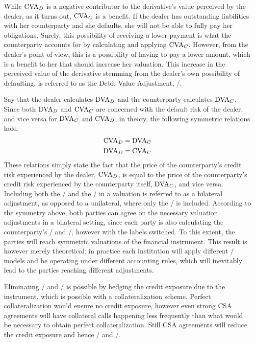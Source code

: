 \documentclass[main.tex]{subfiles}
\begin{document}
        While $\CVA/_{D}$ is a negative contributor to the derivative's value perceived by the dealer, 
        as it turns out, $\CVA/_{C}$ is a benefit.
        If the dealer has outstanding liabilities with her counterparty
        and she defaults, she will not be able to fully pay her obligations. 
        Surely, this possibility of receiving a lower payment is what the counterparty accounts for 
        by calculating and applying $\CVA/_{C}$.
        However, from the dealer's point of view, this is a possibility of having to pay a lower amount,
        which is a benefit to her that should increase her valuation.
        This increase in the perceived value of the derivative
        stemming from the dealer's own possibility of defaulting, 
        is referred to as the Debit Value Adjustment, \DVA/.

        Say that the dealer calculates $\DVA/_{D}$ and the counterparty calculates $\DVA/_{C}$.
        Since both $\DVA/_{D}$ and $\CVA/_{C}$ are concerned with the default risk of the dealer,
        and vice versa for $\DVA/_{C}$ and $\CVA/_{D}$, in theory, the following symmetric relations hold:
            \begin{align*}
                \CVA/_{D} &= \DVA/_{C} \\
                \DVA/_{D} &= \CVA/_{C}
            \end{align*}
        These relations simply state the fact that
        the price of the counterparty's credit risk experienced by the dealer, $\CVA/_{D}$,
        is equal to the price of the counterparty's credit risk 
        experienced by the counterparty itself, $\DVA/_{C}$, and vice versa.
        Including both the \CVA/ and the \DVA/ in a valuation is referred to as a bilateral adjustment,
        as opposed to a unilateral, where only the \CVA/ is included.
        According to the symmetry above,
        both parties can agree on the necessary valuation adjustments in a bilateral setting,
        since each party is also calculating the counterparty's \CVA/ and \DVA/, however with the labels switched.
        To this extent, the parties will reach symmetric valuations of the financial instrument. 
        This result is however merely theoretical; 
        in practice each institution will apply different \CVA/ models
        and be operating under different accounting rules, 
        which will inevitably lead to the parties reaching different adjustments. 
        
        Eliminating \CVA/ and \DVA/ is possible by hedging the credit exposure due to the instrument,
        which is possible with a collateralization scheme. 
        Perfect collateralization would ensure no credit exposure,
        however even strong CSA agreements will have collateral calls happening less frequently
        than what would be necessary to obtain perfect collateralization.
        Still CSA agreements will reduce the credit exposure and hence \CVA/ and \DVA/.
\end{document}
